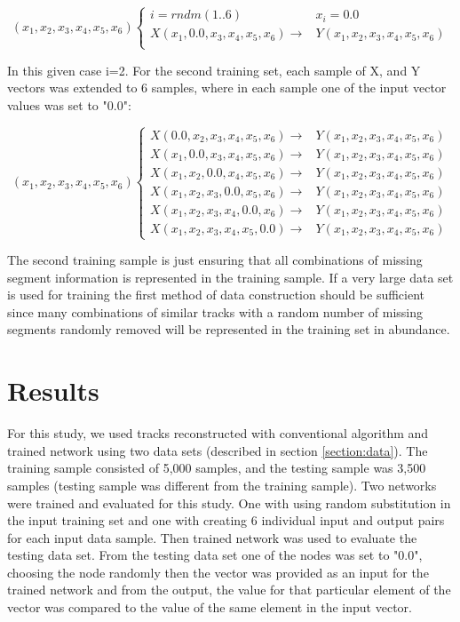 \documentclass[12pt]{article}
\begin{document}
\begin{equation}
  (x_1,x_2,x_3,x_4,x_5,x_6) \begin{cases}
    i = rndm(1..6)  & x_i = 0.0  \\
    X (x_1,0.0,x_3,x_4,x_5,x_6)   \text{$\rightarrow$}  & Y (x_1,x_2,x_3,x_4,x_5,x_6) \\
     \end{cases}
\end{equation}

In this given case i=2. For the second training set, each sample of X, and Y vectors
was extended to 6 samples, where in each sample one of the input vector values 
was set to "0.0":

\begin{equation}
  (x_1,x_2,x_3,x_4,x_5,x_6) \begin{cases}
   X (0.0,x_2,x_3,x_4,x_5,x_6)  \text{$\rightarrow$}  & Y (x_1,x_2,x_3,x_4,x_5,x_6)  \\
   X (x_1,0.0,x_3,x_4,x_5,x_6)   \text{$\rightarrow$}  & Y (x_1,x_2,x_3,x_4,x_5,x_6) \\
   X (x_1,x_2,0.0,x_4,x_5,x_6)  \text{$\rightarrow$}  &  Y (x_1,x_2,x_3,x_4,x_5,x_6) \\
   X (x_1,x_2,x_3,0.0,x_5,x_6)  \text{$\rightarrow$}  & Y (x_1,x_2,x_3,x_4,x_5,x_6) \\
   X (x_1,x_2,x_3,x_4,0.0,x_6)  \text{$\rightarrow$}  & Y (x_1,x_2,x_3,x_4,x_5,x_6) \\
   X (x_1,x_2,x_3,x_4,x_5,0.0)  \text{$\rightarrow$}  & Y (x_1,x_2,x_3,x_4,x_5,x_6)
  \end{cases}
\end{equation}

The second training sample is just ensuring that all combinations of missing segment information
is represented in the training sample. If a very large data set is used for training the first method of data
construction should be sufficient since many combinations of similar tracks with a random number of missing
segments randomly removed will be represented in the training set in abundance.


\section{Results}

\indent

For this study, we used tracks reconstructed with conventional algorithm and trained network using two data sets
(described in section \ref{section:data}). The training sample consisted of 5,000 samples, and the testing sample was 3,500 samples
(testing sample was different from the training sample). Two networks were trained and evaluated for this study. 
One with using random substitution in the input training set and one with creating 6 individual input and output pairs for each input data sample.
Then trained network was used to evaluate the testing data set. From the testing data set one of the nodes was set to "0.0", choosing the node 
randomly then the vector was provided as an input for the trained network and from the output, the value for that particular element of the vector 
was compared to the value of the same element in the input vector.
\end{document}
